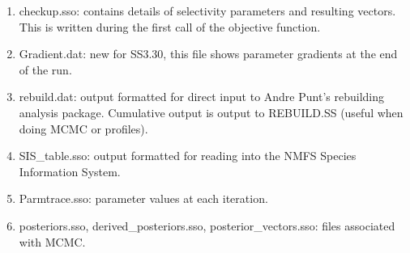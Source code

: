 \begin{enumerate}
		\item checkup.sso:  contains details of selectivity parameters and resulting vectors.  This is written during the first call of the objective function.
		\item Gradient.dat: new for SS3.30, this file shows parameter gradients at the end of the run.
		\item rebuild.dat:  output formatted for direct input to Andre Punt's rebuilding analysis package.  Cumulative output is output to REBUILD.SS (useful when doing MCMC or profiles).
		\item SIS\_table.sso:  output formatted for reading into the NMFS Species Information System.
		\item Parmtrace.sso: parameter values at each iteration.
		\item posteriors.sso, derived\_posteriors.sso, posterior\_vectors.sso: files associated with MCMC.
	\end{enumerate}

	
